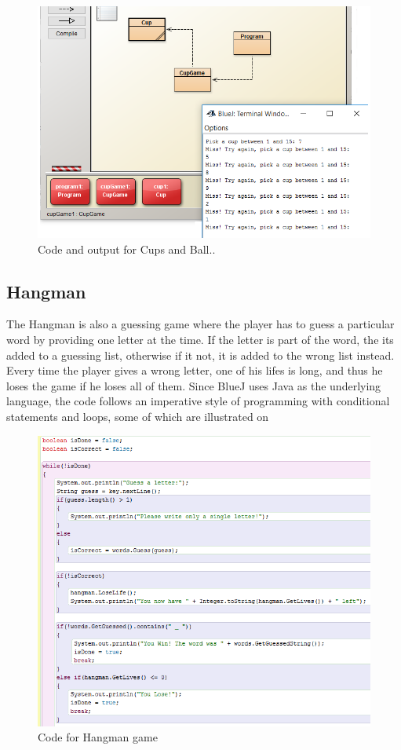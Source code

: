 \begin{figure}[!h]
  \centering
      \includegraphics[scale=0.7]{./pics/bluej_ballcup_code}
      \caption{Code and output for Cups and Ball..}
      \label{fig:bluej_ballcup_code} 
\end{figure}

\subsection{Hangman}
The Hangman is also a guessing game where the player has to guess a particular word by providing one letter at the time. If the letter is part of the word, the its added to a guessing list, otherwise if it not, it is added to the wrong list instead. Every time the player gives a wrong letter, one of his lifes is long, and thus he loses the game if he loses all of them. Since BlueJ uses Java as the underlying language, the code follows an imperative style of programming with conditional statements and loops, some of which are illustrated on  

\begin{figure}[!h]
  \centering
      \includegraphics[scale=0.7]{./pics/bluej_hangman_code}
      \caption{Code for Hangman game}
      \label{fig:bluej_hangman_code} 
\end{figure}
